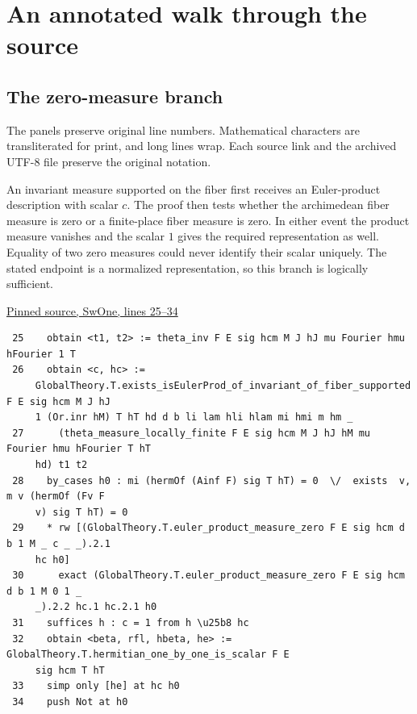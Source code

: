 \documentclass[12pt,letterpaper]{article}
\begin{document}
\clearpage\section{An annotated walk through the source}\subsection*{The zero-measure branch}

{\small The panels preserve original line numbers. Mathematical characters are transliterated for print, and long lines wrap. Each source link and the archived UTF-8 file preserve the original notation.}\par

An invariant measure supported on the fiber first receives an Euler-product description with scalar \(c\). The proof then tests whether the archimedean fiber measure is zero or a finite-place fiber measure is zero. In either event the product measure vanishes and the scalar \(1\) gives the required representation as well. Equality of two zero measures could never identify their scalar uniquely. The stated endpoint is a normalized representation, so this branch is logically sufficient.

\par\smallskip\href{https://github.com/nousentllc/riemann-hypothesis/blob/40e56bab026552e089d7afcfeff08d2defb9c005/src/CompanionTheory/AutomorphicTheory/ThetaDilations/SwOne.lean#L25-L34}{\sffamily\small Pinned source, SwOne, lines 25--34}\par

{\footnotesize\begin{verbatim}
 25    obtain <t1, t2> := theta_inv F E sig hcm M J hJ mu Fourier hmu hFourier 1 T
 26    obtain <c, hc> :=
     GlobalTheory.T.exists_isEulerProd_of_invariant_of_fiber_supported F E sig hcm M J hJ
     1 (Or.inr hM) T hT hd d b li lam hli hlam mi hmi m hm _
 27      (theta_measure_locally_finite F E sig hcm M J hJ hM mu Fourier hmu hFourier T hT
     hd) t1 t2
 28    by_cases h0 : mi (hermOf (Ainf F) sig T hT) = 0  \/  exists  v, m v (hermOf (Fv F
     v) sig T hT) = 0
 29    * rw [(GlobalTheory.T.euler_product_measure_zero F E sig hcm d b 1 M _ c _ _).2.1
     hc h0]
 30      exact (GlobalTheory.T.euler_product_measure_zero F E sig hcm d b 1 M 0 1 _
     _).2.2 hc.1 hc.2.1 h0
 31    suffices h : c = 1 from h \u25b8 hc
 32    obtain <beta, rfl, hbeta, he> := GlobalTheory.T.hermitian_one_by_one_is_scalar F E
     sig hcm T hT
 33    simp only [he] at hc h0
 34    push Not at h0
\end{verbatim}
}
\end{document}
